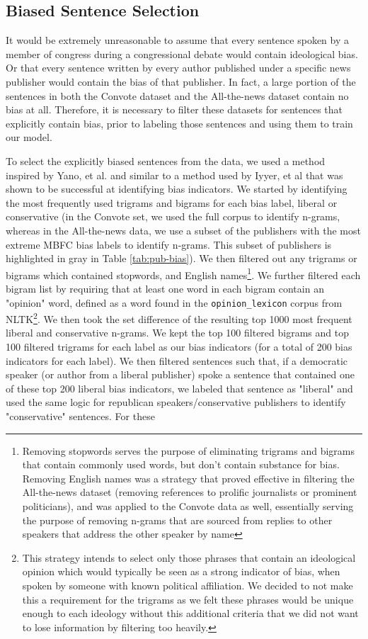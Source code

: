 \documentclass[10pt,a4paper,onecolumn]{article}
\begin{document}
\subsection{Biased Sentence Selection}
\label{sec:filtering}
It would be extremely unreasonable to assume that every sentence spoken by a member of congress during a congressional debate would contain ideological bias. Or that every sentence written by every author published under a specific news publisher would contain the bias of that publisher. In fact, a large portion of the sentences in both the Convote dataset and the All-the-news dataset contain no bias at all. Therefore, it is necessary to filter these datasets for sentences that explicitly contain bias, prior to labeling those sentences and using them to train our model.

To select the explicitly biased sentences from the data, we used a method inspired by Yano, et al. \cite{YanoBigrams} and similar to a method used by Iyyer, et al \cite{iyyerRNN} that was shown to be successful at identifying bias indicators. We started by identifying the most frequently used trigrams and bigrams for each bias label, liberal or conservative (in the Convote set, we used the full corpus to identify n-grams, whereas in the All-the-news data, we use a subset of the publishers with the most extreme MBFC bias labels to identify n-grams. This subset of publishers is highlighted in gray in Table \ref{tab:pub-bias}). We then filtered out any trigrams or bigrams which contained stopwords, and English names\footnote{Removing stopwords serves the purpose of eliminating trigrams and bigrams that contain commonly used words, but don't contain substance for bias. Removing English names was a strategy that proved effective in filtering the All-the-news dataset (removing references to prolific journalists or prominent politicians), and was applied to the Convote data as well, essentially serving the purpose of removing n-grams that are sourced from replies to other speakers that address the other speaker by name}. We further filtered each bigram list by requiring that at least one word in each bigram contain an "opinion" word, defined as a word found in the \texttt{opinion\_lexicon} corpus from NLTK\footnote{This strategy intends to select only those phrases that contain an ideological opinion which would typically be seen as a strong indicator of bias, when spoken by someone with known political affiliation. We decided to not make this a requirement for the trigrams as we felt these phrases would be unique enough to each ideology without this additional criteria that we did not want to lose information by filtering too heavily.}. We then took the set difference of the resulting top 1000 most frequent liberal and conservative n-grams. We kept the top 100 filtered bigrams and top 100 filtered trigrams for each label as our bias indicators (for a total of 200 bias indicators for each label). We then filtered sentences such that, if a democratic speaker (or author from a liberal publisher) spoke a sentence that contained one of these top 200 liberal bias indicators, we labeled that sentence as "liberal" and used the same logic for republican speakers/conservative publishers to identify "conservative" sentences. For these 
\end{document}
